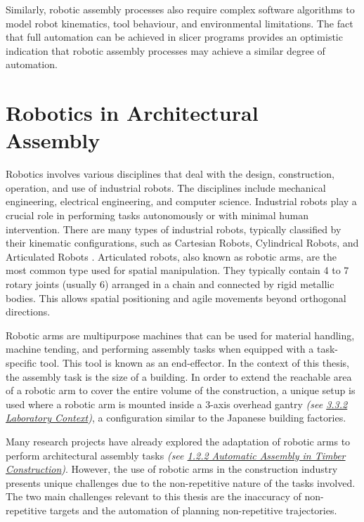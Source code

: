 Similarly, robotic assembly processes also require complex software algorithms to model robot kinematics, tool behaviour, and environmental limitations. The fact that full automation can be achieved in slicer programs provides an optimistic indication that robotic assembly processes may achieve a similar degree of automation.

\section{Robotics in Architectural Assembly}

Robotics involves various disciplines that deal with the design, construction, operation, and use of industrial robots. The disciplines include mechanical engineering, electrical engineering, and computer science. Industrial robots play a crucial role in performing tasks autonomously or with minimal human intervention. There are many types of industrial robots, typically classified by their kinematic configurations, such as Cartesian Robots, Cylindrical Robots, and Articulated Robots \parencite{waldronKinematics2016}. Articulated robots, also known as robotic arms, are the most common type used for spatial manipulation. They typically contain 4 to 7 rotary joints (usually 6) arranged in a chain and connected by rigid metallic bodies. This allows spatial positioning and agile movements beyond orthogonal directions.

Robotic arms are multipurpose machines that can be used for material handling, machine tending, and performing assembly tasks when equipped with a task-specific tool. This tool is known as an end-effector. In the context of this thesis, the assembly task is the size of a building. In order to extend the reachable area of a robotic arm to cover the entire volume of the construction, a unique setup is used where a robotic arm is mounted inside a 3-axis overhead gantry\textit{ (see \ul{3.3.2 Laboratory Context})}, a configuration similar to the Japanese building factories.

Many research projects have already explored the adaptation of robotic arms to perform architectural assembly tasks \textit{(see \ul{1.2.2 Automatic Assembly in Timber Construction})}. However, the use of robotic arms in the construction industry presents unique challenges due to the non-repetitive nature of the tasks involved. The two main challenges relevant to this thesis are the inaccuracy of non-repetitive targets and the automation of planning non-repetitive trajectories.


